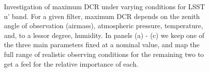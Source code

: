 \documentclass[]{article}
\begin{document}
\begin{figure}
	\begin{center}
		\caption{Investigation of maximum DCR under varying conditions for LSST u' band. For a given filter, maximum DCR depends on the zenith angle of observation (airmass), atmospheric pressure, temperature, and, to a lessor degree, humidity. In panels (a) - (c) we keep one of the three main parameters fixed at a nominal value, and map the full range of realistic observing conditions for the remaining two to get a feel for the relative importance of each.}
		\label{Fig:DCR-P-T}
	\end{center}
\end{figure}
\end{document}
